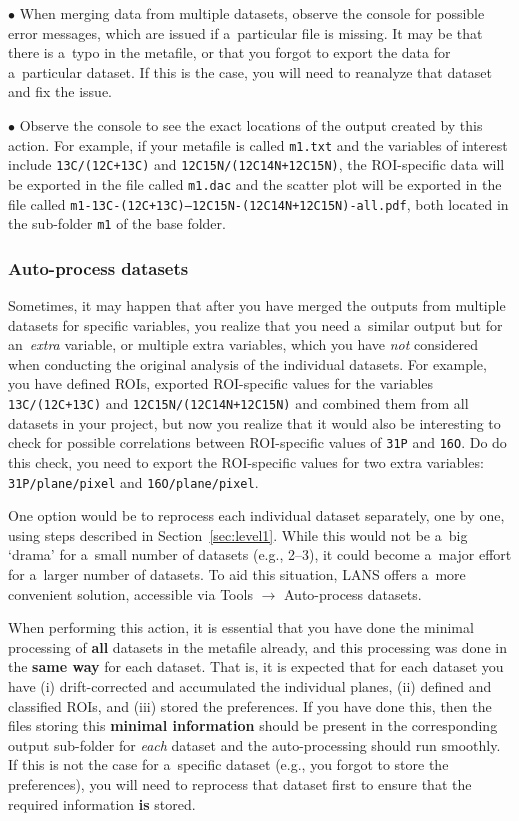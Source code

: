 \documentclass[a4paper, 11pt]{article}
\newcommand{\ttt}[1]{\texttt{#1}}
\newcommand{\lans}[1]{{\color{magenta}#1}}
\newcommand{\lanstf}[1]{{\color{cyan}#1}}
\newcommand\ra{\rightarrow}
\newcounter{step}
\newcommand\bul{\vskip5pt\noindent$\bullet${ }}
\newcommand\bb[1]{\textbf{#1}}
\begin{document}
\bul When merging data from multiple datasets, observe the console for possible error messages, which are issued if a~particular file is missing. It may be that there is a~typo in the metafile, or that you forgot to export the data for a~particular dataset. If this is the case, you will need to reanalyze that dataset and fix the issue.

\bul Observe the console to see the exact locations of the output created by this action. For example, if your metafile is called \ttt{m1.txt} and the variables of interest include \ttt{13C/(12C+13C)} and \ttt{12C15N/(12C14N+12C15N)}, the ROI-specific data will be exported in the file called \ttt{m1.dac} and the scatter plot will be exported in the file called \ttt{m1-13C-(12C+13C)--12C15N-(12C14N+12C15N)-all.pdf}, both located in the sub-folder \ttt{m1} of the \lanstf{base folder}.


\subsubsection{Auto-process datasets}
\setcounter{step}{0}

Sometimes, it may happen that after you have merged the outputs from multiple datasets for specific variables, you realize that you need a~similar output but for an~\emph{extra} variable, or multiple extra variables, which you have \emph{not} considered when conducting the original analysis of the individual datasets. For example, you have defined ROIs, exported ROI-specific values for the variables \ttt{13C/(12C+13C)} and \ttt{12C15N/(12C14N+12C15N)} and combined them from all datasets in your project, but now you realize that it would also be interesting to check for possible correlations between ROI-specific values of \ttt{31P} and \ttt{16O}. Do do this check, you need to export the ROI-specific values for two extra variables: \ttt{31P/plane/pixel} and \ttt{16O/plane/pixel}. 

One option would be to reprocess each individual dataset separately, one by one, using steps described in Section~\ref{sec:level1}. While this would not be a~big `drama' for a~small number of datasets (e.g., 2--3), it could become a~major effort for a~larger number of datasets. To aid this situation, LANS offers a~more convenient solution, accessible via \lans{Tools} $\ra$ \lans{Auto-process datasets}.

When performing this action, it is essential that you have done the minimal processing of \bb{all} datasets in the metafile already, and this processing was done in the \bb{same way} for each dataset. That is, it is expected that for each dataset you have (i) drift-corrected and accumulated the individual planes, (ii) defined and classified ROIs, and (iii) stored the preferences. If you have done this, then the files storing this \bb{minimal information} should be present in the corresponding output sub-folder for \emph{each} dataset and the auto-processing should run smoothly. If this is not the case for a~specific dataset (e.g., you forgot to store the preferences), you will need to reprocess that dataset first to ensure that the required information \bb{is} stored.
\end{document}

